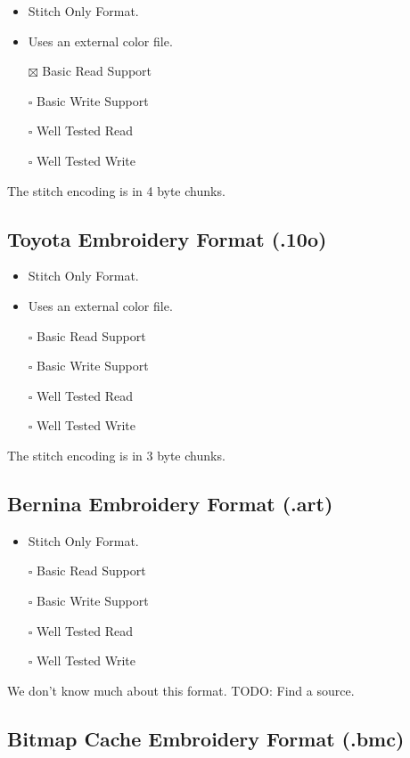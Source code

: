 \documentclass[onesize, a4paper]{refart}
\providecommand{\tightlist}{\setlength{\itemsep}{0pt}\setlength{\parskip}{0pt}}
\begin{document}
\begin{itemize}
\tightlist
\item Stitch Only Format.
\item Uses an external color file.
\item[$\boxtimes$] Basic Read Support
\item[$\square$] Basic Write Support
\item[$\square$] Well Tested Read
\item[$\square$] Well Tested Write
\end{itemize}

The stitch encoding is in 4 byte chunks.

\subsection{Toyota Embroidery Format (.10o)}

\begin{itemize}
\tightlist
\item Stitch Only Format.
\item Uses an external color file.
\item[$\square$] Basic Read Support
\item[$\square$] Basic Write Support
\item[$\square$] Well Tested Read
\item[$\square$] Well Tested Write
\end{itemize}

The stitch encoding is in 3 byte chunks.

\subsection{Bernina Embroidery Format (.art)}

\begin{itemize}
\tightlist
\item Stitch Only Format.
\item[$\square$] Basic Read Support
\item[$\square$] Basic Write Support
\item[$\square$] Well Tested Read
\item[$\square$] Well Tested Write
\end{itemize}

We don't know much about this format. TODO: Find a source.

\subsection{Bitmap Cache Embroidery Format (.bmc)}
\end{document}
